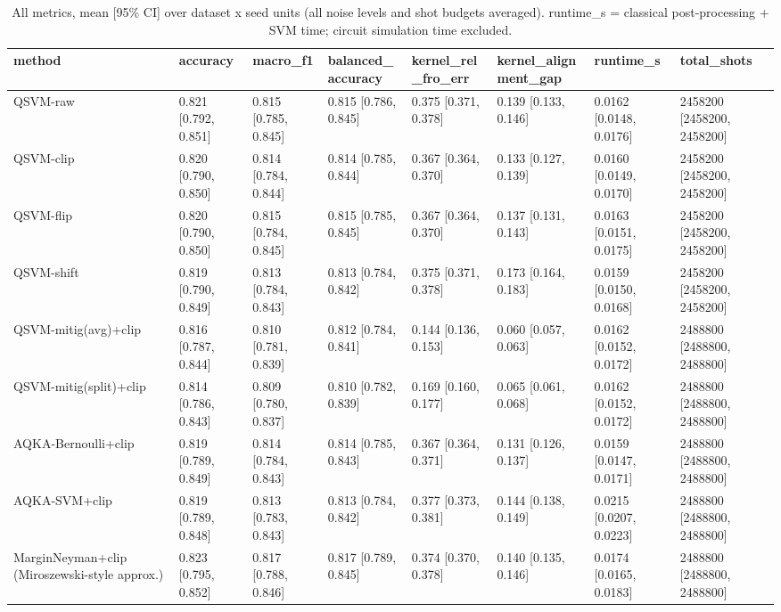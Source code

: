 \begin{table}[t]
\centering
\caption{All metrics, mean [95\% CI] over dataset x seed units (all noise levels and shot budgets averaged). runtime\_s = classical post-processing + SVM time; circuit simulation time excluded.}
\label{tab:all}
\small
\begin{tabular}{llllllll}
\hline
method & accuracy & macro\_f1 & balanced\_accuracy & kernel\_rel\_fro\_err & kernel\_alignment\_gap & runtime\_s & total\_shots \\
\hline
QSVM-raw & 0.821 [0.792, 0.851] & 0.815 [0.785, 0.845] & 0.815 [0.786, 0.845] & 0.375 [0.371, 0.378] & 0.139 [0.133, 0.146] & 0.0162 [0.0148, 0.0176] & 2458200 [2458200, 2458200] \\
QSVM-clip & 0.820 [0.790, 0.850] & 0.814 [0.784, 0.844] & 0.814 [0.785, 0.844] & 0.367 [0.364, 0.370] & 0.133 [0.127, 0.139] & 0.0160 [0.0149, 0.0170] & 2458200 [2458200, 2458200] \\
QSVM-flip & 0.820 [0.790, 0.850] & 0.815 [0.784, 0.845] & 0.815 [0.785, 0.845] & 0.367 [0.364, 0.370] & 0.137 [0.131, 0.143] & 0.0163 [0.0151, 0.0175] & 2458200 [2458200, 2458200] \\
QSVM-shift & 0.819 [0.790, 0.849] & 0.813 [0.784, 0.843] & 0.813 [0.784, 0.842] & 0.375 [0.371, 0.378] & 0.173 [0.164, 0.183] & 0.0159 [0.0150, 0.0168] & 2458200 [2458200, 2458200] \\
QSVM-mitig(avg)+clip & 0.816 [0.787, 0.844] & 0.810 [0.781, 0.839] & 0.812 [0.784, 0.841] & 0.144 [0.136, 0.153] & 0.060 [0.057, 0.063] & 0.0162 [0.0152, 0.0172] & 2488800 [2488800, 2488800] \\
QSVM-mitig(split)+clip & 0.814 [0.786, 0.843] & 0.809 [0.780, 0.837] & 0.810 [0.782, 0.839] & 0.169 [0.160, 0.177] & 0.065 [0.061, 0.068] & 0.0162 [0.0152, 0.0172] & 2488800 [2488800, 2488800] \\
AQKA-Bernoulli+clip & 0.819 [0.789, 0.849] & 0.814 [0.784, 0.843] & 0.814 [0.785, 0.843] & 0.367 [0.364, 0.371] & 0.131 [0.126, 0.137] & 0.0159 [0.0147, 0.0171] & 2488800 [2488800, 2488800] \\
AQKA-SVM+clip & 0.819 [0.789, 0.848] & 0.813 [0.783, 0.843] & 0.813 [0.784, 0.842] & 0.377 [0.373, 0.381] & 0.144 [0.138, 0.149] & 0.0215 [0.0207, 0.0223] & 2488800 [2488800, 2488800] \\
MarginNeyman+clip (Miroszewski-style approx.) & 0.823 [0.795, 0.852] & 0.817 [0.788, 0.846] & 0.817 [0.789, 0.845] & 0.374 [0.370, 0.378] & 0.140 [0.135, 0.146] & 0.0174 [0.0165, 0.0183] & 2488800 [2488800, 2488800] \\

\end{tabular}
\end{table}
